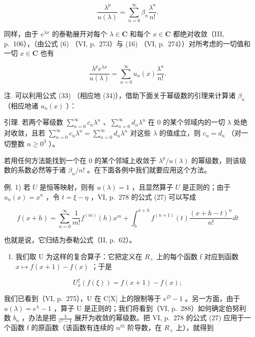 \[
{\frac {\lambda^ {p}}{u (\lambda)}} = \sum_ {n = 0} ^ {\infty} \beta_ {n} {\frac {\lambda^ {n}}{n !}}.\tag{33}
\]

同样，由于 \(e^{\lambda x}\) 的泰勒展开对每个 \(\lambda \in \mathbf{C}\) 和每个 \(x \in \mathbf{C}\) 都绝对收敛（III, p.~106），（由公式 (6) （VI, p.~273）与 (16) （VI, p.~274））对所考虑的一切值和一切 \(x \in \mathbf{C}\) 也有

\[
\frac {\lambda^ {p} e ^ {\lambda x}}{u (\lambda)} = \sum_ {n = 0} ^ {\infty} u _ {n} (x) \frac {\lambda^ {n}}{n !}.\tag{34}
\]

注. 可以利用公式 (33) （相应地 (34)），借助下面关于幂级数的引理来计算诸 \(\beta_{n}\) （相应地诸 \(u_{n}(x)\) ）：

引理. 若两个幂级数 \(\sum_{n=0}^{\infty} c_n \lambda^n\) 、\(\sum_{n=0}^{\infty} d_n \lambda^n\) 在 0 的某个邻域内的一切 \(\lambda\) 处绝对收敛，且若 \(\sum_{n=0}^{\infty} c_n \lambda^n = \sum_{n=0}^{\infty} d_n \lambda^n\) 对这些 \(\lambda\) 的值成立，则 \(c_n = d_n\) （对一切整数 \(n \geqslant 0^3\) ）。

若用任何方法能找到一个在 0 的某个邻域上收敛于 \(\lambda^p / u(\lambda)\) 的幂级数，则该级数的系数必然等于诸 \(\beta_n / n!\) 。在下面各例中我们就要应用这个方法。

例. 1) 若 \(U\) 是恒等映射，则有 \(u(\lambda) = 1\) ，且显然算子 \(U\) 是正则的；由于 \(u_{n}(x) = x^{n}\) ，令 \(t = \xi - \eta\) ，VI, p.~278 的公式 (27) 可以写成

\[
f (x + h) = \sum_ {n = 0} ^ {\infty} \frac {1}{m !} f ^ {(m)} (h) x ^ {m} + \int_ {h} ^ {x + h} f ^ {(n + 1)} (t) \frac {(x + h - t) ^ {n}}{n !} d t
\]

也就是说，它归结为泰勒公式（II, p.~62）。

\begin{enumerate}
\def\labelenumi{\arabic{enumi})}
\setcounter{enumi}{1}
\tightlist
\item
  我们取 U 为这样的复合算子：它把定义在 \(R_{+}\) 上的每个函数 f 对应到函数 \(x \mapsto f(x + 1) - f(x)\) ；于是
\end{enumerate}

\[
U _ {x} ^ {\xi} (f (\xi)) = f (x + 1) - f (x);
\]

我们已看到（VI, p.~275），U 在 C{[}X{]} 上的限制等于 \(e^{D}-1\) 。另一方面，由于 \(u(\lambda)=e^{\lambda}-1\) ，算子 U 是正则的；我们将看到（VI, p.~288）如何确定伯努利数 \(b_{n}\) ，办法是把 \(\frac{\lambda}{e^{\lambda}-1}\) 展开为收敛的幂级数。把 VI, p.~278 的公式 (27) 应用于一个函数 f 的原函数（该函数有连续的 \(n^{th}\) 阶导数，在 \(R_{+}\) 上），就得到

